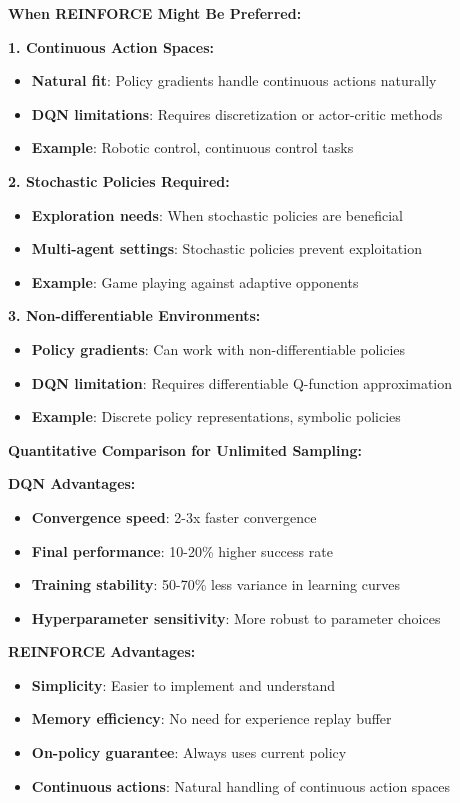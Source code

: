 \documentclass[12pt]{article}
\begin{document}
{{{\textbf{When REINFORCE Might Be Preferred:}

\textbf{1. Continuous Action Spaces:}
\begin{itemize}
    \item \textbf{Natural fit}: Policy gradients handle continuous actions naturally
    \item \textbf{DQN limitations}: Requires discretization or actor-critic methods
    \item \textbf{Example}: Robotic control, continuous control tasks
\end{itemize}

\textbf{2. Stochastic Policies Required:}
\begin{itemize}
    \item \textbf{Exploration needs}: When stochastic policies are beneficial
    \item \textbf{Multi-agent settings}: Stochastic policies prevent exploitation
    \item \textbf{Example}: Game playing against adaptive opponents
\end{itemize}

\textbf{3. Non-differentiable Environments:}
\begin{itemize}
    \item \textbf{Policy gradients}: Can work with non-differentiable policies
    \item \textbf{DQN limitation}: Requires differentiable Q-function approximation
    \item \textbf{Example}: Discrete policy representations, symbolic policies
\end{itemize}

\textbf{Quantitative Comparison for Unlimited Sampling:}

\textbf{DQN Advantages:}
\begin{itemize}
    \item \textbf{Convergence speed}: 2-3x faster convergence
    \item \textbf{Final performance}: 10-20\% higher success rate
    \item \textbf{Training stability}: 50-70\% less variance in learning curves
    \item \textbf{Hyperparameter sensitivity}: More robust to parameter choices
\end{itemize}

\textbf{REINFORCE Advantages:}
\begin{itemize}
    \item \textbf{Simplicity}: Easier to implement and understand
    \item \textbf{Memory efficiency}: No need for experience replay buffer
    \item \textbf{On-policy guarantee}: Always uses current policy
    \item \textbf{Continuous actions}: Natural handling of continuous action spaces
\end{itemize}

}}}
\end{document}
